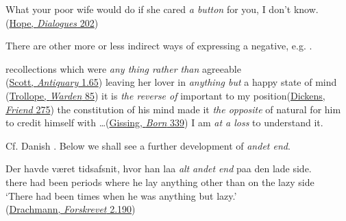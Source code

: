 \ea \label{ex:04-235}
What your poor wife would do if she cared \textit{a button} for you, I don't know.\\\hfill(\href{https://archive.org/details/dollydialogues00hope_0/page/150/mode/2up?view=theater&q=\%22cared+a+button%22}{Hope, \textit{Dialogues} 202})
\z

 \label{sec:other-indirect}

There are other more or less indirect ways of expressing a negative, e.g. .

\ea \label{ex:04-236}
\ea
recollections which were \textit{any thing rather than} agreeable\\\hfill(\href{https://archive.org/details/antiquary20unkngoog/page/n98/mode/2up?q=\%22rather+than+agreeable\%22&view=theater}{Scott, \textit{Antiquary} 1.65})
\ex
leaving her lover in \textit{anything but} a happy state of mind\\\hfill(\href{https://archive.org/details/warden0000anth_w6p5/page/80/mode/2up?q=\%22anything+but+a+happy\%22&view=theater}{Trollope, \textit{Warden} 85})
\ex
it is \textit{the reverse of} important to my position\hfill(\href{https://archive.org/details/ourmutualfriendc0000char/page/204/mode/2up?q=\%22reverse+of+important\%22&view=theater}{Dickens, \textit{Friend} 275})
\ex
the constitution of his mind made it \textit{the opposite} of natural for him to credit himself with {\dots}\hfill(\href{https://www.gutenberg.org/cache/epub/4526/pg4526-images.html}{Gissing, \textit{Born} 339})
\ex
I am \textit{at a loss} to understand it. %
\z
\z

Cf. Danish . Below we shall see a further development of \textit{andet end}. %

\ea \label{ex:04-241}
\gll Der havde været tidsafsnit, hvor han laa \textit{alt} \textit{andet} \textit{end} paa den lade side.\\
 there had been periods where he lay anything other than on the lazy side\\
\glt `There had been times when he was anything but lazy.'\\
\hfill(\href{https://tekster.kb.dk/text/adl-texts-drachmann14val-root#s517}{Drachmann, \textit{Forskrevet} 2.190}) %
\z


